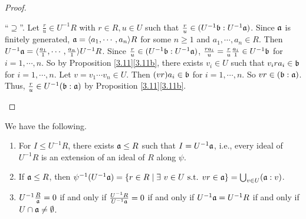 \begin{proof}
\begin{enumerate}
            ``$\supseteq$''. Let $\frac{r}{u} \in U^{-1}R$ with $r \in R,u \in U$ such that $\frac{r}{u} \in (U^{-1}\mathfrak{b}:U^{-1}\mathfrak{a})$. Since $\mathfrak{a}$ is finitely generated, $\mathfrak{a} = \langle a_{1},\cdots,a_{n} \rangle R$ for some $n \geq 1$ and $a_{1},\cdots,a_{n} \in R$. Then $U^{-1}\mathfrak{a} = \langle \frac{a_{1}}{1},\cdots,\frac{a_{n}}{1} \rangle U^{-1}R$. Since $\frac{r}{u} \in (U^{-1}\mathfrak{b}:U^{-1}\mathfrak{a})$, $\frac{ra_{i}}{u} = \frac{r}{u} \frac{a_{i}}{1} \in U^{-1}\mathfrak{b}$ for $i = 1,\cdots,n$. So by Proposition \ref{3.11}\ref{3.11b}, there exists $v_{i} \in U$ such that $v_{i} ra_{i} \in \mathfrak{b}$ for $i = 1,\cdots,n$. Let $v = v_{1} \cdots v_{n} \in U$. Then $(vr)a_{i} \in \mathfrak{b}$ for $i = 1,\cdots,n$. So $vr \in (\mathfrak{b}:\mathfrak{a})$. Thus, $\frac{r}{u} \in U^{-1}(\mathfrak{b}:\mathfrak{a})$ by Proposition \ref{3.11}\ref{3.11b}. \qedhere
    \end{enumerate}
\end{proof}

\begin{proposition}\label{3.13}
    We have the following.
    \begin{enumerate}
        \item\label{3.13a} For $I \leq U^{-1}R$, there exists $\mathfrak{a} \leq R$ such that $I = U^{-1}\mathfrak{a}$, i.e., every ideal of $U^{-1}R$ is an extension of an ideal of $R$ along $\psi$.
        \item\label{3.13b} If $\mathfrak{a} \leq R$, then $\psi^{-1}(U^{-1}\mathfrak{a}) =\{r \in R \mid \exists \  v \in U \text{ s.t. }v r \in \mathfrak{a}\} = \bigcup_{v \in U} (\mathfrak{a}:v)$.
        \item\label{3.13c} $U^{-1} \frac{R}{\mathfrak{a}} = 0$ if and only if $\frac{U^{-1}R}{U^{-1}\mathfrak{a}} = 0$ if and only if $U^{-1}\mathfrak{a} = U^{-1}R$ if and only if $U \cap \mathfrak{a} \neq \emptyset$.
    \end{enumerate}
\end{proposition}

